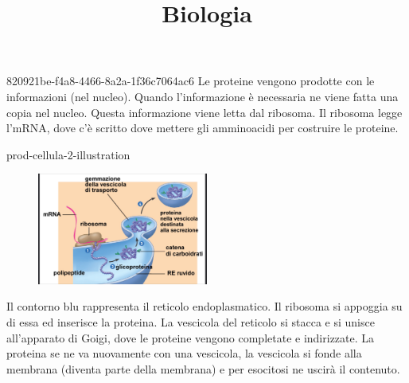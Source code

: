 \documentclass[preview]{standalone}
\begin{document}
\title{Biologia}
\genpage


\begin{snippet}{820921be-f4a8-4466-8a2a-1f36c7064ac6}
    Le proteine vengono prodotte con le informazioni (nel nucleo).
    Quando l'informazione è necessaria ne viene fatta una copia nel nucleo.
    Questa informazione viene letta dal ribosoma.
    Il ribosoma legge l'mRNA,
    dove c'è scritto dove mettere gli amminoacidi per costruire le proteine.
\end{snippet}

\begin{snippet}{prod-cellula-2-illustration}
    \setlength{\intextsep}{0pt}%
    \begin{figure}
        \includegraphics[width=0.5\textwidth]{./resources/prod_cellula2.png}
    \end{figure}

    Il contorno blu rappresenta il reticolo endoplasmatico.
    Il ribosoma si appoggia su di essa ed inserisce la proteina.
    La vescicola del reticolo si stacca e si unisce all'apparato di Goigi, dove le proteine
    vengono completate e indirizzate.
    La proteina se ne va nuovamente con una vescicola, la vescicola si fonde alla membrana (diventa parte della membrana)
    e per esocitosi ne uscirà il contenuto.

    \wrapfill
\end{snippet}
\end{document}

